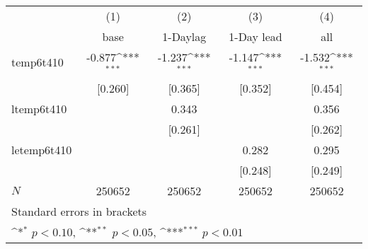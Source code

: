 {
\def\sym#1{\ifmmode^{#1}\else\(^{#1}\)\fi}
\begin{tabular}{l*{4}{c}}
\hline\hline
            &\multicolumn{1}{c}{(1)}&\multicolumn{1}{c}{(2)}&\multicolumn{1}{c}{(3)}&\multicolumn{1}{c}{(4)}\\
            &\multicolumn{1}{c}{base}&\multicolumn{1}{c}{1-Daylag}&\multicolumn{1}{c}{1-Day lead}&\multicolumn{1}{c}{all}\\
\hline
temp6t410   &      -0.877\sym{***}&      -1.237\sym{***}&      -1.147\sym{***}&      -1.532\sym{***}\\
            &     [0.260]         &     [0.365]         &     [0.352]         &     [0.454]         \\
[1em]
ltemp6t410  &                     &       0.343         &                     &       0.356         \\
            &                     &     [0.261]         &                     &     [0.262]         \\
[1em]
letemp6t410 &                     &                     &       0.282         &       0.295         \\
            &                     &                     &     [0.248]         &     [0.249]         \\
\hline
\(N\)       &      250652         &      250652         &      250652         &      250652         \\
\hline\hline
\multicolumn{5}{l}{\footnotesize Standard errors in brackets}\\
\multicolumn{5}{l}{\footnotesize \sym{*} \(p<0.10\), \sym{**} \(p<0.05\), \sym{***} \(p<0.01\)}\\
\end{tabular}
}
